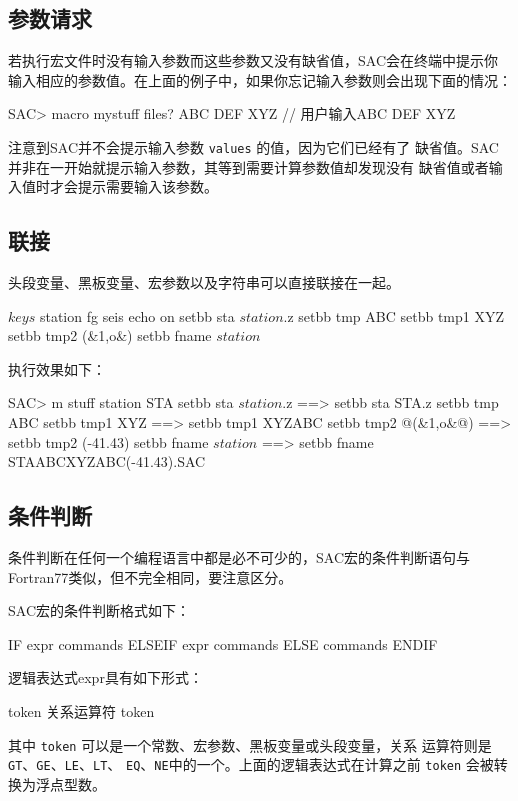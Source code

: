 \subsection{参数请求}
若执行宏文件时没有输入参数而这些参数又没有缺省值，SAC会在终端中提示你
输入相应的参数值。在上面的例子中，如果你忘记输入参数则会出现下面的情况：
\begin{SACCode}
SAC> macro mystuff
files? ABC DEF XYZ          // 用户输入ABC DEF XYZ
\end{SACCode}
注意到SAC并不会提示输入参数 \texttt{values} 的值，因为它们已经有了
缺省值。SAC并非在一开始就提示输入参数，其等到需要计算参数值却发现没有
缺省值或者输入值时才会提示需要输入该参数。

\subsection{联接}
头段变量、黑板变量、宏参数以及字符串可以直接联接在一起。

\begin{SACCode}
$keys$ station
fg seis
echo on
setbb sta $station$.z
setbb tmp ABC
setbb tmp1 XYZ%
setbb tmp2 (&1,o&)
setbb fname $station$%
\end{SACCode}

执行效果如下：
\begin{SACCode}
SAC> m stuff station STA
 setbb sta $station$.z
 ==>  setbb sta STA.z
 setbb tmp ABC
 setbb tmp1 XYZ%
 ==>  setbb tmp1 XYZABC
 setbb tmp2 @(&1,o&@)
 ==>  setbb tmp2 (-41.43)
 setbb fname $station$%
 ==>  setbb fname STAABCXYZABC(-41.43).SAC
\end{SACCode}

\subsection{条件判断}
条件判断在任何一个编程语言中都是必不可少的，SAC宏的条件判断语句与
Fortran77类似，但不完全相同，要注意区分。

SAC宏的条件判断格式如下：
\begin{SACCode}
  IF expr
  	commands
  ELSEIF expr
  	commands
  ELSE
  	commands
  ENDIF
\end{SACCode}

逻辑表达式expr具有如下形式：
\begin{SACCode}
    token 关系运算符 token
\end{SACCode}
其中 \texttt{token} 可以是一个常数、宏参数、黑板变量或头段变量，关系
运算符则是 \texttt{GT}、\texttt{GE}、\texttt{LE}、\texttt{LT}、
\texttt{EQ}、\texttt{NE}中的一个。上面的逻辑表达式在计算之前 \texttt{token}
会被转换为浮点型数。

